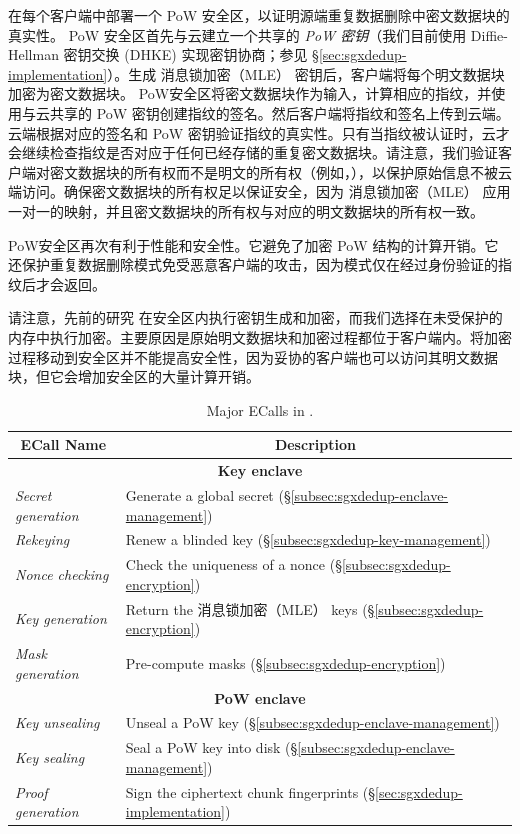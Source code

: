 \sysnameS 在每个客户端中部署一个 PoW 安全区，以证明源端重复数据删除中密文数据块的真实性。 PoW 安全区首先与云建立一个共享的 \textit{ PoW 密钥}（我们目前使用 Diffie-Hellman 密钥交换 (DHKE) 实现密钥协商；参见 \S\ref{sec:sgxdedup-implementation}）。生成 消息锁加密（MLE） 密钥后，客户端将每个明文数据块加密为密文数据块。 PoW安全区将密文数据块作为输入，计算相应的指纹，并使用与云共享的 PoW 密钥创建指纹的签名。然后客户端将指纹和签名上传到云端。云端根据对应的签名和 PoW 密钥验证指纹的真实性。只有当指纹被认证时，云才会继续检查指纹是否对应于任何已经存储的重复密文数据块。请注意，我们验证客户端对密文数据块的所有权而不是明文的所有权（例如，\cite{halevi11}），以保护原始信息不被云端访问。确保密文数据块的所有权足以保证安全，因为 消息锁加密（MLE） 应用一对一的映射，并且密文数据块的所有权与对应的明文数据块的所有权一致。

PoW安全区再次有利于性能和安全性。它避免了加密 PoW 结构的计算开销。它还保护重复数据删除模式免受恶意客户端的攻击，因为模式仅在经过身份验证的指纹后才会返回。

请注意，先前的研究 \cite{kim19,fuhry20,djoko19} 在安全区内执行密钥生成和加密，而我们选择在未受保护的内存中执行加密。主要原因是原始明文数据块和加密过程都位于客户端内。将加密过程移动到安全区并不能提高安全性，因为妥协的客户端也可以访问其明文数据块，但它会增加安全区的大量计算开销。

\begin{table}[t]
\small
\centering
\begin{tabular}{|l|l|}
\hline
\multicolumn{1}{|c|}{\bf ECall Name} & \multicolumn{1}{c|}{\bf Description}\\ 
\hline
\hline
\multicolumn{2}{|c|}{\bf Key enclave} \\
\hline
\textit{ Secret generation} & Generate a global secret 
(\S\ref{subsec:sgxdedup-enclave-management}) \\
\hline
\textit{ Rekeying} & Renew a blinded key 
(\S\ref{subsec:sgxdedup-key-management}) \\
\hline
\textit{ Nonce checking} & Check the uniqueness of a nonce 
(\S\ref{subsec:sgxdedup-encryption}) \\
\hline
\textit{ Key generation} & Return the 消息锁加密（MLE） keys (\S\ref{subsec:sgxdedup-encryption}) \\
\hline
\textit{ Mask generation} & Pre-compute masks (\S\ref{subsec:sgxdedup-encryption}) \\
\hline
\multicolumn{2}{|c|}{\bf PoW enclave} \\
\hline
  \textit{ Key unsealing} & Unseal a PoW key (\S\ref{subsec:sgxdedup-enclave-management}) \\
\hline
  \textit{ Key sealing} & Seal a PoW key into disk (\S\ref{subsec:sgxdedup-enclave-management})
\\
\hline
\textit{ Proof generation} & Sign the ciphertext chunk fingerprints 
(\S\ref{sec:sgxdedup-implementation}) \\
\hline
\end{tabular}
\vspace{-6pt}
\caption{Major ECalls in \sysnameS.}
\label{tab:sgxdedup-ecall}
\vspace{-3pt}
\end{table}


